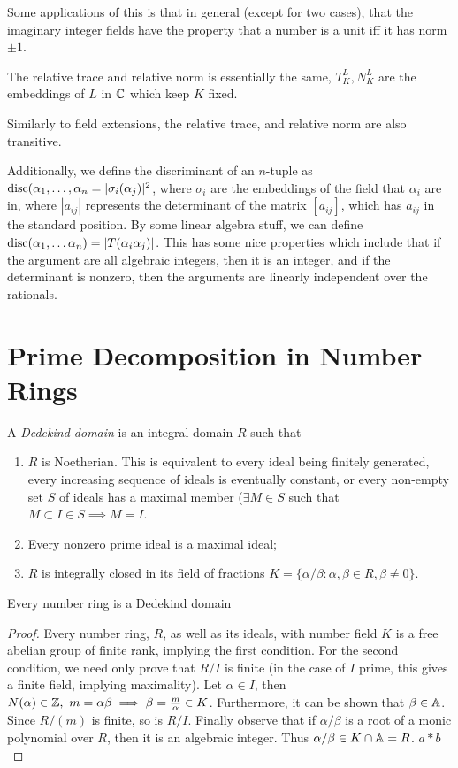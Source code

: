 \documentclass{article}
\begin{document}
Some applications of this is that in general (except for two cases), that the imaginary integer fields have the property that a number is a unit iff it has norm \(\pm1\).

\begin{definition}
The relative trace and relative norm is essentially the same, \(T^L_K, N^L_K\) are the embeddings of \(L\) in \(\CC\) which keep \(K\) fixed.
\end{definition}
Similarly to field extensions, the relative trace, and relative norm are also transitive.

Additionally, we define the discriminant of an \(n\)-tuple as \(\disc(\alpha_1, \dots, \alpha_n = |\sigma_i(\alpha_j)|^2\), where \(\sigma_i\) are the embeddings of the field that \(\alpha_i\) are in, where \(|a_{ij}|\) represents the determinant of the matrix \([a_{ij}]\), which has \(a_{ij}\) in the standard position. By some linear algebra stuff, we can define \(\disc(\alpha_1, \dots \alpha_n)=|T(\alpha_i\alpha_j)|\). 
This has some nice properties which include that if the argument are all algebraic integers, then it is an integer, and if the determinant is nonzero, then the arguments are linearly independent over the rationals.

\section{Prime Decomposition in Number Rings}
\begin{definition}
A \textit{Dedekind domain} is an integral domain \(R\) such that
\begin{enumerate}[label=(\alph*)]
    \item \(R\) is Noetherian. This is equivalent to every ideal being finitely generated, every increasing sequence of ideals is eventually constant, or every non-empty set \(S\) of ideals has a maximal member (\(\exists M \in S\) such that \(M \subset I \in S \implies M=I\).
    \item Every nonzero prime ideal is a maximal ideal;
    \item \(R\) is integrally closed in its field of fractions \(K = \{ \alpha/\beta : \alpha, \beta \in R, \beta \neq 0 \}\).
\end{enumerate}
\end{definition}
\begin{theorem}
Every number ring is a Dedekind domain
\end{theorem}
\begin{proof}
Every number ring, \(R\), as well as its ideals, with number field \(K\) is a free abelian group of finite rank, implying the first condition. For the second condition, we need only prove that \(R/I\) is finite (in the case of \(I\) prime, this gives a finite field, implying maximality). Let \(\alpha \in I\), then \(N(\alpha) \in \ZZ, \ m=\alpha\beta \implies \beta = \frac{m}{\alpha} \in K\). Furthermore, it can be shown that \(\beta \in \AA\). Since \(R/(m)\) is finite, so is \(R/I\). Finally observe that if \(\alpha/\beta\) is a root of a monic polynomial over \(R\), then it is an algebraic integer. Thus \(\alpha/\beta \in K \cap \AA = R\). \( a \ast b\) 

\end{proof}
\end{document}
